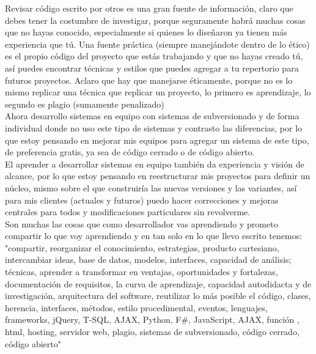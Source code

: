 \documentclass[12pt,spanish,lettersize]{book}
\begin{document}
Revisar c\'odigo escrito por otros es una gran fuente de informaci\'on, claro que debes tener la costumbre de investigar, porque seguramente habr\'a muchas cosas que no hayas conocido, especialmente si quienes lo dise\~naron ya tienen m\'as experiencia que t\'u. Una fuente pr\'actica (siempre manej\'andote dentro de lo \'etico) es el propio c\'odigo del proyecto que est\'as trabajando y que no hayas creado t\'u, as\'i puedes encontrar t\'ecnicas y estilos que puedes agregar a tu repertorio para futuros proyectos. Aclaro que hay que manejarse \'eticamente, porque no es lo mismo replicar una t\'ecnica que replicar un proyecto, lo primero es aprendizaje, lo segundo es plagio (sumamente penalizado)\\

Ahora desarrollo sistemas en equipo con sistemas de subversionado y de forma individual donde no uso este tipo de sistemas y contrasto las diferencias, por lo que estoy pensando en mejorar mis equipos para agregar un sistema de este tipo, de preferencia gratis, ya sea de c\'odigo cerrado o de c\'odigo abierto. \\

El aprender a desarrollar sistemas en equipo tambi\'en da experiencia y visi\'on de alcance, por lo que estoy pensando en reestructurar mis proyectos para definir un n\'ucleo, mismo sobre el que construir\'ia las nuevas versiones y las variantes, as\'i para mis clientes (actuales y futuros) puedo hacer correcciones y mejoras centrales para todos y modificaciones particulares sin revolverme. \\

Son muchas las cosas que como desarrollador vas aprendiendo y prometo compartir lo que voy aprendiendo y en tan solo en lo que llevo escrito tenemos: \\

"compartir, reorganizar el conocimiento, estrategias, producto cartesiano, intercambiar ideas, base de datos, modelos, interfaces, capacidad de an\'alisis; t\'ecnicas, aprender a transformar en ventajas, oportunidades y fortalezas, documentaci\'on de requisitos, la curva de aprendizaje, capacidad autodidacta y de investigaci\'on, arquitectura del software, reutilizar lo m\'as posible el c\'odigo, clases, herencia, interfaces, m\'etodos, estilo procedimental, eventos, lenguajes, frameworks, jQuery, T-SQL, AJAX, Python, F\#, JavaScript, AJAX, funci\'on , html, hosting, servidor web, plagio, sistemas de subversionado, c\'odigo cerrado, c\'odigo abierto" \\
\end{document}
